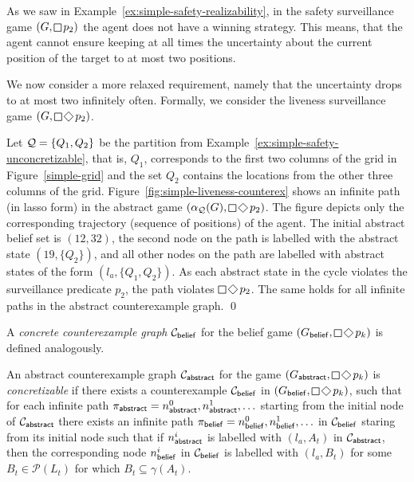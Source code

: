 \begin{example}\label{ex:simple-liveness-counterex}
As we saw in Example~\ref{ex:simple-safety-realizability}, in the safety surveillance game $(G,\LTLglobally p_2)$ the agent does not have a winning strategy. This means, that the agent cannot ensure keeping at all times the uncertainty about the current position of the target to at most two positions.

We now consider a more relaxed requirement, namely that the uncertainty drops to at most two infinitely often. Formally, we consider the liveness surveillance game 
$(G,\LTLglobally \LTLfinally p_2)$.

Let $\mathcal{Q} = \{Q_1,Q_2\}$ be the partition from Example~\ref{ex:simple-safety-unconcretizable},  that is, $Q_1$, corresponds to the first two columns of the grid in Figure~\ref{simple-grid} and the set $Q_2$ contains the locations from the other three columns of the grid. Figure~\ref{fig:simple-liveness-counterex} shows an infinite path (in lasso form) in the abstract game $(\alpha_\part(G),\LTLglobally \LTLfinally p_2)$.  The figure depicts only the corresponding trajectory (sequence of positions) of the agent. The initial abstract belief set is $(12,32)$, the second node on the path is labelled with the abstract state $(19,\{Q_2\})$, and all other nodes on the path are labelled with abstract states of the form $(l_a,\{Q_1,Q_2\})$. As each abstract state in the cycle violates the surveillance predicate $p_2$, the path violates $\LTLglobally \LTLfinally p_2$. The same holds for all infinite paths in the abstract counterexample graph.
\qed
\end{example}

A \emph{concrete counterexample graph} $\mathcal{C}_{\mathsf{belief}}$ for the belief game $(G_\belief,\LTLglobally\LTLfinally p_k)$ is defined analogously. 

An abstract counterexample graph $\mathcal{C}_{\mathsf{abstract}}$ for the game $(G_\abstr,\LTLglobally\LTLfinally p_k)$ is \emph{concretizable} if there exists a counterexample
$\mathcal{C}_{\mathsf{belief}}$ in $(G_\belief,\LTLglobally \LTLfinally p_k)$, such that for each infinite path $\pi_{\mathsf{abstract}} = n_{\mathsf{abstract}}^0,n_{\mathsf{abstract}}^1,\ldots$ starting from the initial node of $\mathcal{C}_{\mathsf{abstract}}$ there exists an infinite path $\pi_{\mathsf{belief}} = n_{\mathsf{belief}}^0,n_{\mathsf{belief}}^1,\ldots$ in $\mathcal{C}_{\mathsf{belief}}$ staring from its initial node such that if $n_{\mathsf{abstract}}^i$ is labelled with $(l_a,A_t)$ in $\mathcal{C}_{\mathsf{abstract}}$, then the corresponding node $n_{\mathsf{belief}}^i$ in $\mathcal{C}_{\mathsf{belief}}$ is labelled with $(l_a,B_t)$ for some $B_t \in \mathcal{P}(L_t)$ for which $B_t \subseteq \gamma(A_t)$.

